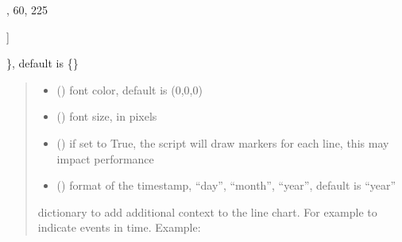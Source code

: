 \documentclass[letterpaper,10pt,english]{sphinxmanual}
\begin{document}
\begin{fulllineitems}
\begin{quote}
\begin{description}
\begin{itemize}
\end{itemize}

\end{description}\end{quote}
\begin{description}
\begin{description}
\sphinxlineitem{\{}\begin{description}
\sphinxlineitem{“United States”: {[}}
,
60,
225

\end{description}

\sphinxAtStartPar
{]}

\end{description}

\sphinxAtStartPar
\}, default is \{\}

\end{description}
\begin{quote}\begin{description}
\begin{itemize}
\item {} 
\sphinxAtStartPar
{} () \textendash{} font color, default is (0,0,0)

\item {} 
\sphinxAtStartPar
{} () \textendash{} font size, in pixels

\item {} 
\sphinxAtStartPar
{} () \textendash{} if set to True, the script will draw markers for each line, this may impact performance

\item {} 
\sphinxAtStartPar
{} () \textendash{} format of the timestamp, “day”, “month”, “year”, default is “year”

\end{itemize}

\sphinxAtStartPar
dictionary to add additional context to the line chart. For example to indicate events in time. Example:


\end{description}
\end{quote}
\end{fulllineitems}
\end{document}
